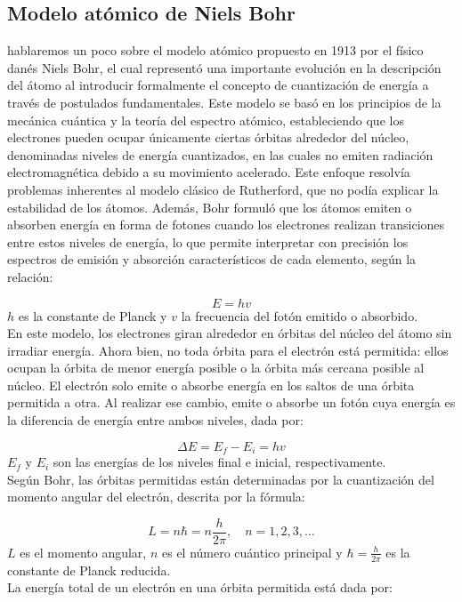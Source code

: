\subsection*{Modelo atómico de Niels Bohr}
\noindent 
hablaremos un poco sobre el modelo atómico propuesto en 1913 por el físico danés Niels Bohr, el cual representó una importante evolución en la descripción del átomo al introducir formalmente el concepto de cuantización de energía a través de postulados fundamentales. Este modelo se basó en los principios de la mecánica cuántica y la teoría del espectro atómico, estableciendo que los electrones pueden ocupar únicamente ciertas órbitas alrededor del núcleo, denominadas niveles de energía cuantizados, en las cuales no emiten radiación electromagnética debido a su movimiento acelerado. Este enfoque resolvía problemas inherentes al modelo clásico de Rutherford, que no podía explicar la estabilidad de los átomos. Además, Bohr formuló que los átomos emiten o absorben energía en forma de fotones cuando los electrones realizan transiciones entre estos niveles de energía, lo que permite interpretar con precisión los espectros de emisión y absorción característicos de cada elemento, según la relación:

\[
E = hv
\]
\noindent 
$h$ es la constante de Planck y $v$ la frecuencia del fotón emitido o absorbido.\\[0.5em]
\noindent 
En este modelo, los electrones giran alrededor en órbitas del núcleo del átomo sin irradiar energía. Ahora bien, no toda órbita para el electrón está permitida: ellos ocupan la órbita de menor energía posible o la órbita más cercana posible al núcleo. El electrón solo emite o absorbe energía en los saltos de una órbita permitida a otra. Al realizar ese cambio, emite o absorbe un fotón cuya energía es la diferencia de energía entre ambos niveles, dada por:

\[
\Delta E = E_f - E_i = h v
\]
\noindent 
$E_f$ y $E_i$ son las energías de los niveles final e inicial, respectivamente.\\[0.5em]
\noindent 
Según Bohr, las órbitas permitidas están determinadas por la cuantización del momento angular del electrón, descrita por la fórmula:

\[
L = n \hbar = n \frac{h}{2\pi}, \quad n = 1, 2, 3, \ldots
\]
\noindent 
$L$ es el momento angular, $n$ es el número cuántico principal y $\hbar = \frac{h}{2\pi}$ es la constante de Planck reducida.\\[0.5em]
\noindent 
La energía total de un electrón en una órbita permitida está dada por:

